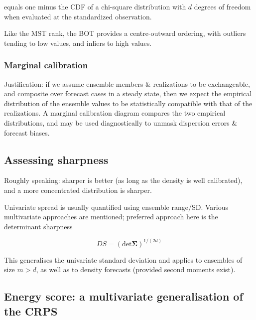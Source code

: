 \documentclass[10pt,fleqn]{article}
\begin{document}
equals one minus the CDF of a chi-square distribution with $d$ degrees of freedom when evaluated at the standardized observation.

Like the MST rank, the BOT provides a centre-outward ordering, with outliers tending to low values, and inliers to high values.  

\subsubsection*{Marginal calibration}

Justification: if we assume ensemble members \& realizations to be exchangeable, and composite over forecast cases in a steady state, then we expect the empirical distribution of the ensemble values to be statistically compatible with that of the realizations. A marginal calibration diagram compares the two empirical distributions, and may be used diagnostically to unmask dispersion errors \& forecast biases.


\subsection{Assessing sharpness}

Roughly speaking: sharper is better (as long as the density is well calibrated), and a more concentrated distribution is sharper.

Univariate spread is usually quantified using ensemble range/SD. Various multivariate approaches are mentioned; preferred approach here is the determinant sharpness

\[ DS = (\text{det} \boldsymbol{\Sigma})^{1/(2d)} \]

This generalises the univariate standard deviation and applies to ensembles of size $m > d$, as well as to density forecasts (provided second moments exist).

\subsection{Energy score: a multivariate generalisation of the CRPS}
\end{document}
